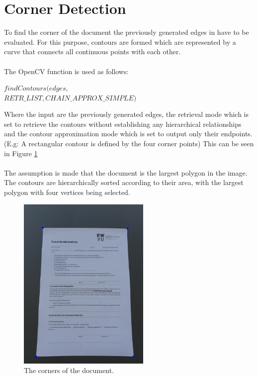 \documentclass[twocolumn,10pt]{asme2ej}
\begin{document}
\section{Corner Detection}
\noindent
To find the corner of the document the previously generated edges 
in  have to be evaluated.
For this purpose, contours are formed which are represented by a curve that connects all 
continuous points with each other\cite{SUZUKI198532}.\\\\
\noindent
The OpenCV function\cite{opencv_findcontours} is used as follows:
\begin{center}
    \noindent
    $findContours(edges,$\\
    $RETR\_LIST, CHAIN\_APPROX\_SIMPLE)$
\end{center}
\noindent
Where the input are the previously generated edges, the retrieval 
mode\cite{opencv_retrievalmode} which is 
set to retrieve the contours without establishing any hierarchical relationships 
and the contour approximation mode\cite{opencv_approxmode} which is set to output only their endpoints.
(E.g: A rectangular contour is defined by the four corner points)
This can be seen in Figure \ref{fig:contours}\\\\
\noindent
The assumption is made that the document is the largest polygon in the image.
The contours are hierarchically sorted according to their area, with the largest polygon with four vertices being selected.

\begin{figure}[H]
\centerline{\includegraphics[width=2.5in]{output/hoch_3_5_contouredimage.jpg}}
\caption{The corners of the document.}
\label{fig:contours}
\end{figure}
\end{document}
